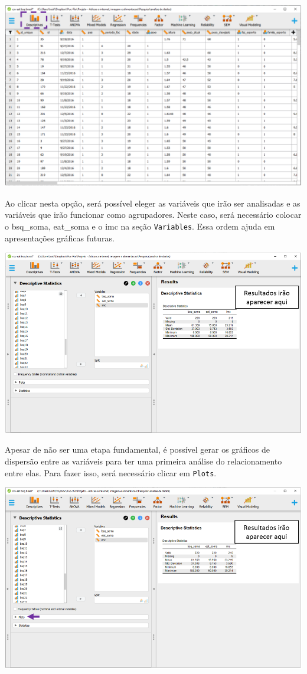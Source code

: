 \documentclass[
]{book}
\begin{document}
\includegraphics{./img/cap_correlacao_descritivo.png}

Ao clicar nesta opção, será possível eleger as variáveis que irão ser
analisadas e as variáveis que irão funcionar como agrupadores. Neste
caso, será necessário colocar o bsq\_soma, eat\_soma e o imc na seção
\texttt{Variables}. Essa ordem ajuda em apresentações gráficas futuras.

\includegraphics{./img/cap_reg_multipla_descriptives.png}

Apesar de não ser uma etapa fundamental, é possível gerar os gráficos de
dispersão entre as variáveis para ter uma primeira análise do
relacionamento entre elas. Para fazer isso, será necessário clicar em
\texttt{Plots}.

\includegraphics{./img/cap_reg_multipla_plots.png}
\end{document}
